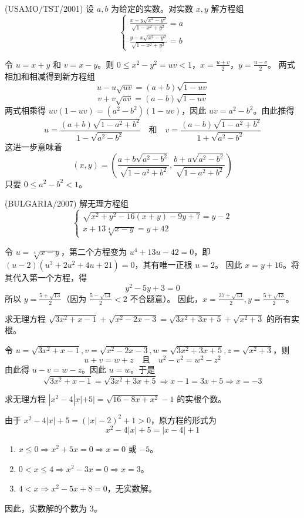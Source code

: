 \begin{questions}
\question
(USAMO/TST/2001) 设 $a, b$ 为给定的实数。对实数 $x, y$ 解方程组
\[
\begin{cases} \frac{x-y\sqrt{x^2-y^2}}{\sqrt{1-x^2+y^2}}=a \\ \frac{y-x\sqrt{x^2-y^2}}{\sqrt{1-x^2+y^2}}=b \end{cases}
\]
\begin{solution}
令 $u=x+y$ 和 $v=x-y$。则 $0 \le x^2-y^2=uv < 1$，$x=\frac{u+v}{2}$，$y=\frac{u-v}{2}$。
两式相加和相减得到新方程组
\[
u-u\sqrt{uv}=(a+b)\sqrt{1-uv}
\]
\[
v+v\sqrt{uv}=(a-b)\sqrt{1-uv}
\]
两式相乘得 $uv(1-uv)=\left(a^2-b^2\right)(1-uv)$，因此 $uv=a^2-b^2$。由此推得
\[
u=\frac{(a+b)\sqrt{1-a^2+b^2}}{1-\sqrt{a^2-b^2}} \quad \text{和} \quad v=\frac{(a-b)\sqrt{1-a^2+b^2}}{1+\sqrt{a^2-b^2}}
\]
这进一步意味着
\[
(x, y)=\left(\frac{a+b\sqrt{a^2-b^2}}{\sqrt{1-a^2+b^2}}, \frac{b+a\sqrt{a^2-b^2}}{\sqrt{1-a^2+b^2}}\right)
\]
只要 $0 \le a^2-b^2 < 1$。
\end{solution}

\question
(BULGARIA/2007) 解无理方程组
\[
\begin{cases} \sqrt{x^2+y^2-16(x+y)-9y+7}=y-2 \\ x+13\sqrt[4]{x-y}=y+42 \end{cases}
\]
\begin{solution}
令 $u=\sqrt[4]{x-y}$，第二个方程变为 $u^4+13u-42=0$，即 $(u-2)\left(u^3+2u^2+4u+21\right)=0$，其有唯一正根 $u=2$。
因此 $x=y+16$。将其代入第一个方程，得
\[
y^2-5y+3=0
\]
所以 $y=\frac{5+\sqrt{13}}{2}$（因为 $\frac{5-\sqrt{13}}{2} < 2$ 不合题意）。
因此，$x=\frac{37+\sqrt{13}}{2}, y=\frac{5+\sqrt{13}}{2}$。
\end{solution}

\question
求无理方程 $\sqrt{3x^2+x-1}+\sqrt{x^2-2x-3}=\sqrt{3x^2+3x+5}+\sqrt{x^2+3}$ 的所有实根。
\begin{solution}
令 $u=\sqrt{3x^2+x-1}, v=\sqrt{x^2-2x-3}, w=\sqrt{3x^2+3x+5}, z=\sqrt{x^2+3}$，则
\[
u+v=w+z \quad \text{且} \quad u^2-v^2=w^2-z^2
\]
由此得 $u-v=w-z$。因此 $u=w$。于是
\[
\sqrt{3x^2+x-1}=\sqrt{3x^2+3x+5} \Rightarrow x-1=3x+5 \Rightarrow x=-3
\]
\end{solution}

\question
求无理方程 $|x^2-4|x|+5|=\sqrt{16-8x+x^2}-1$ 的实根个数。
\begin{solution}
由于 $x^2-4|x|+5=(|x|-2)^2+1 > 0$，原方程的形式为
\[
x^2-4|x|+5=|x-4|+1
\]
\begin{enumerate}
    \item $x \le 0 \Rightarrow x^2+5x=0 \Rightarrow x=0$ 或 $-5$。
    \item $0 < x \le 4 \Rightarrow x^2-3x=0 \Rightarrow x=3$。
    \item $4 < x \Rightarrow x^2-5x+8=0$，无实数解。
\end{enumerate}
因此，实数解的个数为 3。
\end{solution}


\end{questions}
